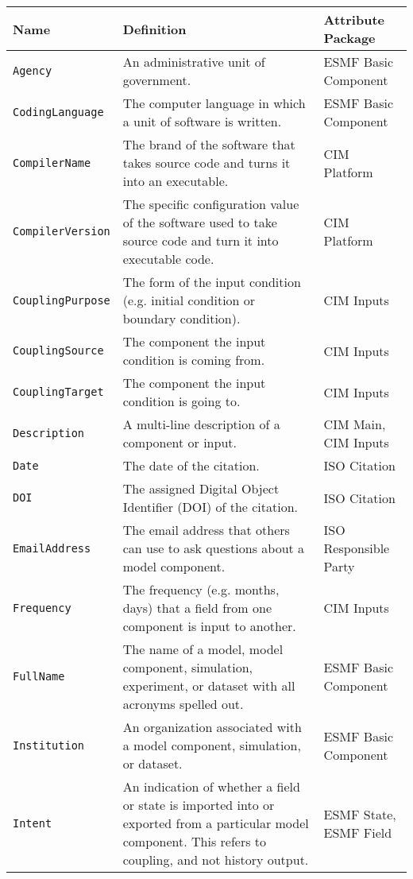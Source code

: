 \begin{longtable}{|p{7cm}|p{5cm}|p{15mm}|}
     \hline\hline
     {\bf Name} & {\bf Definition} & {\bf Attribute Package}\\
     \hline\hline
     {\tt Agency} & An administrative unit of government.& ESMF Basic Component\\
     {\tt CodingLanguage} & The computer language in which a unit of software is written. & ESMF Basic Component\\
     {\tt CompilerName} & The brand of the software that takes source code and turns it into an executable.& CIM Platform\\
     {\tt CompilerVersion} & The specific configuration value of the software used to take source code and turn it into executable code. & CIM Platform\\
     {\tt CouplingPurpose} & The form of the input condition (e.g. initial condition or boundary condition). &  CIM Inputs \\
     {\tt CouplingSource} & The component the input condition is coming from. & CIM Inputs\\ 
     {\tt CouplingTarget} & The component the input condition is going to. & CIM Inputs\\ 
     {\tt Description} & A multi-line description of a component or input. & CIM Main, CIM Inputs \\
     {\tt Date} & The date of the citation. & ISO Citation\\
     {\tt DOI} & The assigned Digital Object Identifier (DOI) of the citation. & ISO Citation\\
     {\tt EmailAddress} & The email address that others can use to ask questions about a model component. & ISO Responsible Party\\
     {\tt Frequency} & The frequency (e.g. months, days) that a field from one component is input to another. & CIM Inputs\\ 
     {\tt FullName} & The name of a model, model component, simulation, experiment, or dataset with all acronyms spelled out.& ESMF Basic Component\\
     {\tt Institution} & An organization associated with a model component, simulation, or dataset.& ESMF Basic Component\\
     {\tt Intent} & An indication of whether a field or state is imported into or exported from a particular model component. This refers to coupling, and not history output. & ESMF State, ESMF Field\\

\end{longtable}
